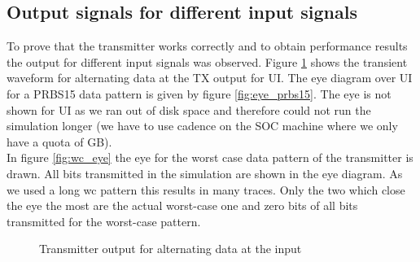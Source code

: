 \subsection{Output signals for different input signals}

To prove that the transmitter works correctly and to obtain performance results the output for different input signals was observed. Figure \ref{fig:alternating_data} shows the transient waveform for alternating data at the TX output for \unit[6]{UI}. The eye diagram over \unit[5000]{UI} for a PRBS15 data pattern is given by figure \ref{fig:eye_prbs15}. The eye is not shown for \unit[10000]{UI} as we ran out of disk space and therefore could not run the simulation longer (we have to use cadence on the SOC machine where we only have a quota of \unit[4]{GB}).\\
In figure \ref{fig:wc_eye} the eye for the worst case data pattern of the transmitter is drawn. All bits transmitted in the simulation are shown in the eye diagram. As we used a long wc pattern this results in many traces. Only the two which close the eye the most are the actual worst-case one and zero bits of all bits transmitted for the worst-case pattern.

\begin{figure}[H]
  \centering
  \caption{Transmitter output for alternating data at the input}
  \label{fig:alternating_data}
\end{figure}


